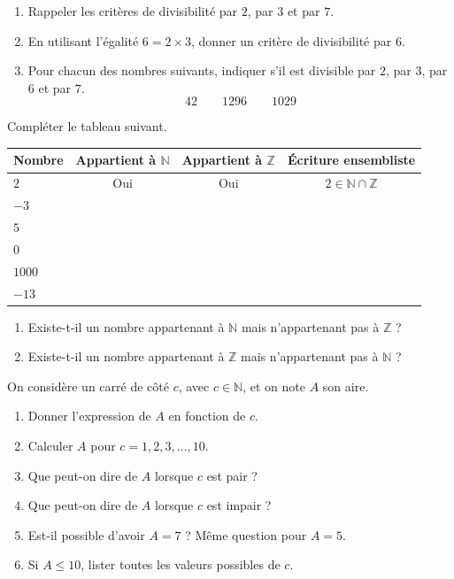 \exo

\begin{enumerate}
\item Rappeler les critères de divisibilité par $2$, par $3$ et par $7$.
\item En utilisant l'égalité $6=2\times 3$, donner un critère de divisibilité par $6$.
\item Pour chacun des nombres suivants, indiquer s'il est divisible par $2$, par $3$, par $6$ et par $7$.
\[
42\qquad 1296\qquad 1029
\]
\end{enumerate}

\exo

Compléter le tableau suivant.

\medskip
\begin{center}
\begin{tabular}{|l|c|c|c|}
\hline
Nombre & Appartient à $\mathbb{N}$ & Appartient à $\mathbb{Z}$ & Écriture ensembliste \\
\hline
$2$ & Oui & Oui & $2\in\mathbb{N}\cap\mathbb{Z}$ \\
\hline
$-3$ & & & \\
\hline
$5$ & & & \\
\hline
$0$ & & & \\
\hline
$1000$ & & & \\
\hline
$-13$ & & & \\
\hline
\end{tabular}
\end{center}

\begin{enumerate}
\item Existe-t-il un nombre appartenant à $\mathbb{N}$ mais n'appartenant pas à $\mathbb{Z}$ ?
\item Existe-t-il un nombre appartenant à $\mathbb{Z}$ mais n'appartenant pas à $\mathbb{N}$ ?
\end{enumerate}

\exo

On considère un carré de côté $c$, avec $c\in\mathbb{N}$, et on note $A$ son aire.
\begin{enumerate}
\item Donner l'expression de $A$ en fonction de $c$.
\item Calculer $A$ pour $c=1,2,3,\ldots,10$.
\item Que peut-on dire de $A$ lorsque $c$ est pair ?
\item Que peut-on dire de $A$ lorsque $c$ est impair ?
\item Est-il possible d'avoir $A=7$ ? Même question pour $A=5$.
\item Si $A\leq 10$, lister toutes les valeurs possibles de $c$.
\end{enumerate}

